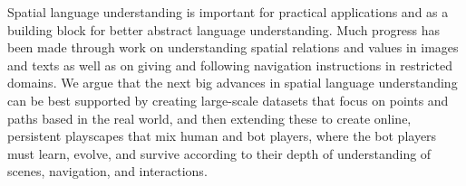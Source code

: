 Spatial language understanding is important for practical applications and as a building block for better abstract language understanding. Much progress has been made through work on understanding spatial relations and values in images and texts as well as on giving and following navigation instructions in restricted domains. We argue that the next big advances in spatial language understanding can be best supported by creating large-scale datasets that focus on points and paths based in the real world, and then extending these to create online, persistent playscapes that mix human and bot players,  where the bot players must learn, evolve, and survive according to their depth of understanding of scenes, navigation, and interactions.
